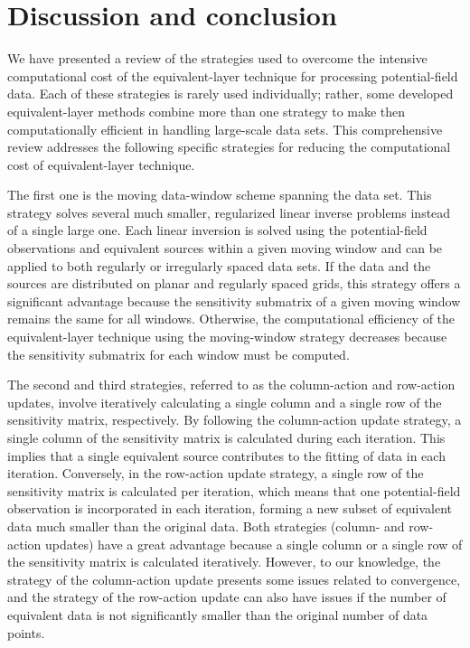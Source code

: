 \section{Discussion and conclusion}

We have presented a review of the strategies used to overcome the intensive computational cost of the equivalent-layer technique for processing potential-field data. 
Each of these strategies is rarely used  individually; rather, some 
developed equivalent-layer methods combine more than one strategy to make then
computationally efficient in handling large-scale data sets.
This comprehensive review addresses the following specific strategies for reducing the computational cost of equivalent-layer technique.

The first one is the moving data-window scheme spanning the data set.
This strategy solves several much smaller, regularized linear inverse problems 
instead of a single large one.
Each linear inversion is solved using the potential-field observations and equivalent sources within a given moving window and can be applied to both regularly or irregularly spaced data sets.
If the data and the sources are distributed on planar and regularly spaced grids, this strategy offers a significant advantage because the sensitivity submatrix of a given moving window remains the same for all windows.
Otherwise, the computational efficiency of the equivalent-layer technique using the moving-window strategy decreases because the sensitivity submatrix for each window must be computed.

The second and third strategies, referred to as the column-action and row-action updates, involve iteratively calculating a single column and a single row of the sensitivity matrix, respectively.
By following the column-action update strategy, a single column of the sensitivity matrix is calculated during each iteration. 
This implies that a single equivalent source contributes to the fitting of data in each iteration.
Conversely, in the row-action update strategy, a single row of the sensitivity matrix is calculated per iteration, which means that  one potential-field observation is incorporated in each iteration, 
forming a new subset of equivalent data much smaller than the original data.
Both strategies (column- and row-action updates) have a great advantage  because a single column or a single row of the sensitivity matrix is calculated iteratively.
However, to our knowledge, the strategy of the column-action update presents some issues related to convergence, and the strategy of the row-action update can also have issues if the number of equivalent data  is not significantly smaller than the original number of data points.


